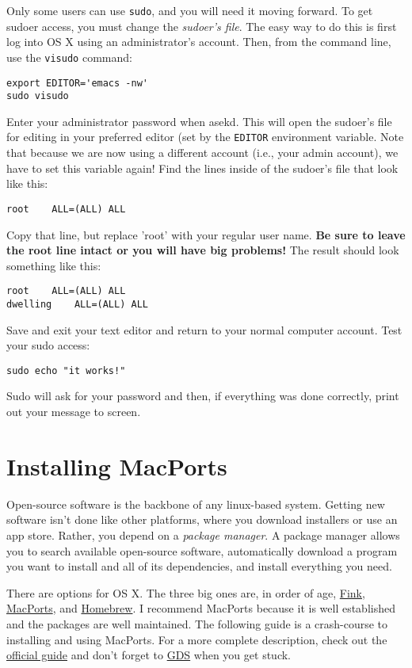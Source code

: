 \documentclass[12pt, letterpaper]{article}
\begin{document}
Only some users can use {\tt sudo}, and you will need it moving forward.  To
get sudoer access, you must change the \emph{sudoer's file}.  The easy way to
do this is first log into OS X using an administrator's account.  Then,
from the command line, use the {\tt visudo} command:
\begin{verbatim}
export EDITOR='emacs -nw'
sudo visudo
\end{verbatim}
Enter your administrator password when asekd.  This will open the sudoer's
file for editing in your preferred editor (set by the {\tt EDITOR} environment
variable.  Note that because we are now using a different account (i.e., your
admin account), we have to set this variable again!
Find the lines inside of the sudoer's file that look like this:
\begin{verbatim}
root    ALL=(ALL) ALL
\end{verbatim}
Copy that line, but replace 'root' with your regular user name.
\textbf{Be sure to leave the root line intact or you will have big problems!}
The result should look something like this:
\begin{verbatim}
root    ALL=(ALL) ALL
dwelling    ALL=(ALL) ALL
\end{verbatim}

Save and exit your text editor and return to your normal computer account.
Test your sudo access:
\begin{verbatim}
sudo echo "it works!"
\end{verbatim}
Sudo will ask for your password and then, if everything was done correctly,
print out your message to screen.

\section{Installing MacPorts}
\label{sec:ports}
Open-source software is the backbone of any linux-based system.  Getting new
software isn't done like other platforms, where you download installers or
use an app store.  Rather, you depend on a \emph{package manager}.  A
package manager allows you to search available open-source software,
automatically download a program you want to install and all of its
dependencies, and install everything you need.

There are options for OS X.  The three big ones are, in order of age,
\href{http://www.finkproject.org/}{Fink},
\href{https://www.macports.org/}{MacPorts}, and
\href{http://brew.sh/}{Homebrew}.
I recommend MacPorts because it is well established and the packages are
well maintained.  The following guide is a crash-course to installing and
using MacPorts.  For a more complete description, check out the
\href{https://guide.macports.org}{official guide} and don't forget to
\href{http://www.google.com}{GDS} when you get stuck.
\end{document}
